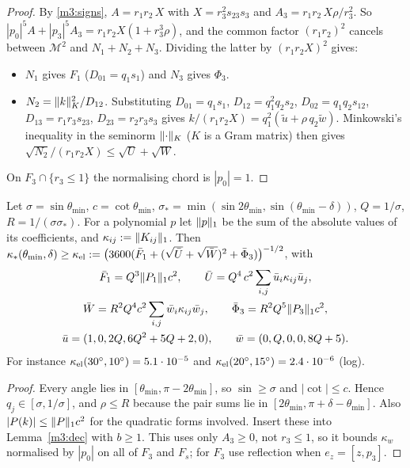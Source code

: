 \begin{proof}
By \eqref{m3:signs}, $A=r_1r_2\,X$ with $X=r_3^2s_{23}s_3$ and $A_3=r_1r_2\,X\rho/r_3^2$. So $|p_0|^5A+|p_3|^5A_3=r_1r_2X(1+r_3^3\rho)$, and the common factor $(r_1r_2)^2$ cancels between $\mathcal M^2$ and $N_1+N_2+N_3$. Dividing the latter by $(r_1r_2X)^2$ gives:
\begin{itemize}
\item $N_1$ gives $F_1$ ($D_{01}=q_1s_1$) and $N_3$ gives $\Phi_3$.
\item $N_2=\lVert k\rVert_K^2/D_{12}$. Substituting $D_{01}=q_1s_1$, $D_{12}=q_1^2q_2s_2$, $D_{02}=q_1q_2s_{12}$, $D_{13}=r_1r_3s_{23}$, $D_{23}=r_2r_3s_3$ gives $k/(r_1r_2X)=q_1^2(\tilde u+\rho\,q_2\tilde w)$. Minkowski's inequality in the seminorm $\lVert \cdot\rVert_K$ ($K$ is a Gram matrix) then gives $\sqrt{N_2}/(r_1r_2X)\le\sqrt U+\sqrt W$.
\end{itemize}
On $F_3\cap\{r_3\le1\}$ the normalising chord is $|p_0|=1$.
\end{proof}

\begin{corollary}\label{m3:el}
Let $\sigma=\sin\theta_{\min}$, $c=\cot\theta_{\min}$, $\sigma_\ast=\min(\sin2\theta_{\min},\sin(\theta_{\min}-\delta))$, $Q=1/\sigma$, $R=1/(\sigma\sigma_\ast)$. For a polynomial $p$ let $\lVert p\rVert_1$ be the sum of the absolute values of its coefficients, and $\kappa_{ij}:=\lVert K_{ij}\rVert_1$. Then $\kappa_\ast(\theta_{\min},\delta)\ge\kappa_{\rm el}:=\bigl(3600(\bar F_1+(\sqrt{\bar U}+\sqrt{\bar W})^2+\bar\Phi_3)\bigr)^{-1/2}$, with
\begin{gather*}
\bar F_1=Q^3\lVert P_1\rVert_1c^2,\qquad \bar U=Q^4\,c^2\sum_{i,j}\bar u_i\kappa_{ij}\bar u_j,\\ \bar W=R^2Q^4c^2\sum_{i,j}\bar w_i\kappa_{ij}\bar w_j,\qquad \bar\Phi_3=R^2Q^5\lVert P_3\rVert_1c^2,\\
\bar u=(1,0,2Q,6Q^2+5Q+2,0),\qquad \bar w=(0,Q,0,0,8Q+5).
\end{gather*}
For instance $\kappa_{\rm el}(30^\circ,10^\circ)=5.1\cdot10^{-5}$ and $\kappa_{\rm el}(20^\circ,15^\circ)=2.4\cdot10^{-6}$ (log).
\end{corollary}

\begin{proof}
Every angle lies in $[\theta_{\min},\pi-2\theta_{\min}]$, so $\sin\ge\sigma$ and $|\cot|\le c$. Hence $q_j\in[\sigma,1/\sigma]$, and $\rho\le R$ because the pair sums lie in $[2\theta_{\min},\pi+\delta-\theta_{\min}]$. Also $|P(k)|\le\lVert P\rVert_1c^2$ for the quadratic forms involved. Insert these into Lemma~\ref{m3:dec} with $b\ge1$. This uses only $A_3\ge0$, not $r_3\le1$, so it bounds $\kappa_w$ normalised by $|p_0|$ on all of $F_3$ and $F_s$; for $F_3$ use reflection when $e_z=[z,p_3]$.
\end{proof}

